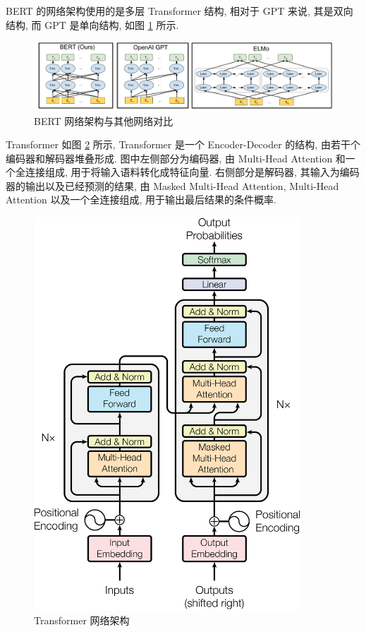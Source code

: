 \documentclass[12pt]{article}
\begin{document}
BERT 的网络架构使用的是多层 Transformer \cite{Vaswani2017Attention} 结构, 相对于 GPT 来说, 其是双向结构, 而 GPT 是单向结构, 如图 \ref{fig:BERT_comparisons} 所示. 

\begin{figure}[htbp]
  \centering
  \includegraphics[width=17cm]{BERT_comparisons.pdf}
  \caption{BERT 网络架构与其他网络对比}
  \label{fig:BERT_comparisons}
\end{figure}

Transformer 如图 \ref{fig:transformer} 所示, Transformer 是一个 Encoder-Decoder 的结构, 由若干个编码器和解码器堆叠形成. 图中左侧部分为编码器, 由 Multi-Head Attention 和一个全连接组成, 用于将输入语料转化成特征向量. 右侧部分是解码器, 其输入为编码器的输出以及已经预测的结果, 由 Masked Multi-Head Attention, Multi-Head Attention 以及一个全连接组成, 用于输出最后结果的条件概率.

\begin{figure}[htbp]
  \centering
  \includegraphics[width=10cm]{ModalNet-21.png}
  \caption{Transformer 网络架构}
  \label{fig:transformer}
\end{figure}
\end{document}
